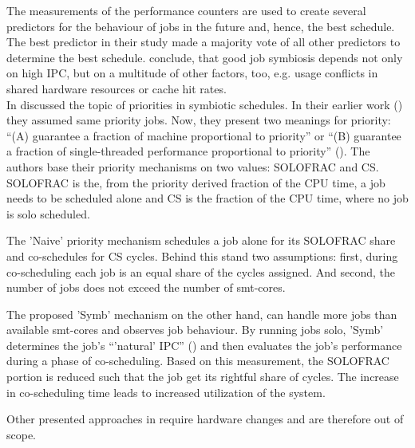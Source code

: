 The measurements of the performance counters are used to create several
predictors for the behaviour of jobs in the future and, hence, the best schedule.
The best predictor in their study made a majority vote of all other predictors
to determine the best schedule.
\citeauthor{snavely_symbiotic_2000} conclude, that good job symbiosis depends
not only on high IPC, but on a multitude of other factors, too, e.g. usage
conflicts in shared hardware resources or cache hit rates.
\\


In \citeyear{snavely_symbiotic_2002} \citeauthor{snavely_symbiotic_2002}
discussed the topic of priorities in symbiotic schedules.
In their earlier work (\cite{snavely_symbiotic_2000}) they assumed same
priority jobs.
Now, they present two meanings for priority: ``(A) guarantee a fraction of
machine proportional to priority'' or ``(B) guarantee a fraction of
single-threaded performance proportional to priority''
(\autocite[70]{snavely_symbiotic_2002}).
The authors base their priority mechanisms on two values: SOLOFRAC and CS.
SOLOFRAC is the, from the priority derived fraction of the CPU time,
a job needs to be scheduled alone and CS is the fraction of the CPU time,
where no job is solo scheduled.

The 'Naive' priority mechanism schedules a job alone for its SOLOFRAC
share and co-schedules for CS cycles. Behind this stand two assumptions: first,
during co-scheduling each job is an equal share of the cycles assigned.
And second, the number of jobs does not exceed the number of \gls{smt}-cores.

The proposed 'Symb' mechanism on the other hand, can handle more jobs
than available \gls{smt}-cores and observes job behaviour. By running jobs
solo, 'Symb' determines the job's ``'natural' IPC''
(\autocite[71]{snavely_symbiotic_2002})
and then evaluates the job's performance during a phase of co-scheduling.
Based on this measurement, the SOLOFRAC portion is reduced such that the job get its
rightful share of cycles. The increase in co-scheduling time leads to increased
utilization of the system.

Other presented approaches in \cite{snavely_symbiotic_2002} require hardware
changes and are therefore out of scope.
\\

